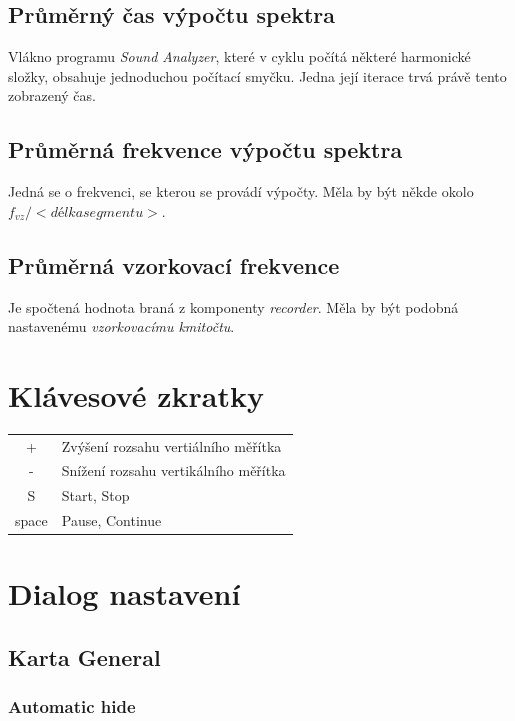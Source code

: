 \subsection{Průměrný čas výpočtu spektra}

Vlákno programu \emph{Sound Analyzer}, které v cyklu počítá některé harmonické složky, obsahuje jednoduchou počítací smyčku. Jedna její iterace trvá právě tento zobrazený čas.

\subsection{Průměrná frekvence výpočtu spektra}

Jedná se o frekvenci, se kterou se provádí výpočty. Měla by být někde okolo\\
 $f_{vz} / <délka segmentu>$.

\subsection{Průměrná vzorkovací frekvence}
\label{sec:avgsamplingfreq}

Je spočtená hodnota braná z komponenty \emph{recorder}. Měla by být podobná
nastavenému \emph{vzorkovacímu kmitočtu}.

\section{Klávesové zkratky}

\begin{tabular}{|c|l|}
\hline
+&Zvýšení rozsahu vertiálního měřítka\\
-&Snížení rozsahu vertikálního měřítka\\
S&Start, Stop\\
space&Pause, Continue\\
\hline 
\end{tabular}


\section{Dialog nastavení}
\label{sec:settingdialog}


\subsection{Karta General}

\subsubsection{Automatic hide}

